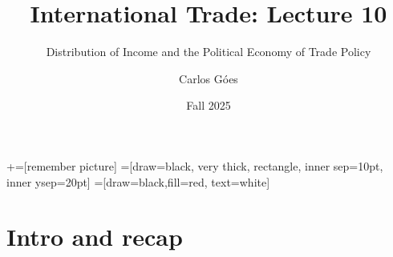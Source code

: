\documentclass[notes,11pt, aspectratio=169, xcolor=table]{beamer}
\title[]{International Trade: Lecture 10}
\subtitle[]{Distribution of Income and the Political Economy of Trade Policy}
\author[Góes]
{Carlos Góes\inst{1}}
\date{Fall 2025}
\institute[GWU]{\inst{1} George Washington University }
\begin{document}
\newcommand\marktopleft[1]{%
    \tikz[overlay,remember picture] 
        \node (marker-#1-a) at (-.3em,.3em) {};%
}
\newcommand\markbottomright[2]{%
    \tikz[overlay,remember picture] 
        \node (marker-#1-b) at (0em,0em) {};%
}
+=[remember picture] 
 =[draw=black, very thick, rectangle, inner sep=10pt, inner ysep=20pt]
 =[draw=black,fill=red, text=white]















\frame{\titlepage}
\addtocounter{framenumber}{-1}




\section{Intro and recap}
\end{document}
